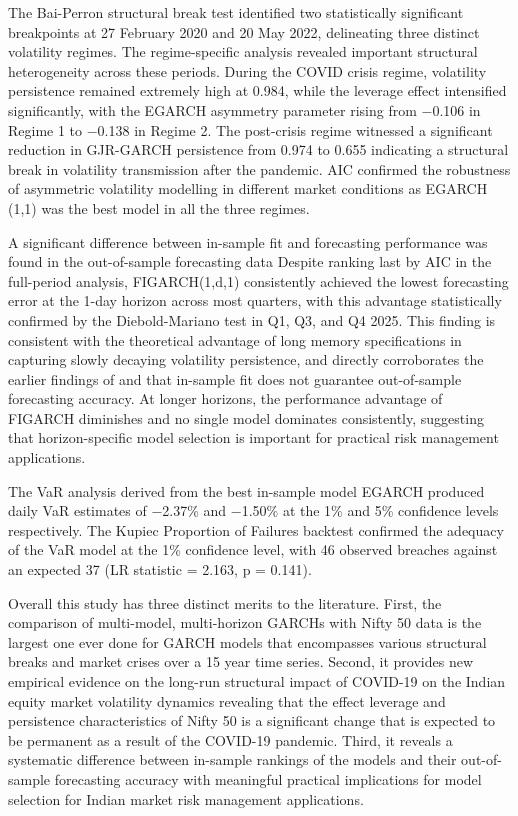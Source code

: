 The Bai-Perron structural break test identified two statistically significant breakpoints at 27 February 2020 and 20 May 2022, delineating three distinct volatility regimes. The regime-specific analysis revealed important structural heterogeneity across these periods. During the COVID crisis regime, volatility persistence remained extremely high at 0.984, while the leverage effect intensified significantly, with the EGARCH asymmetry parameter rising from −0.106 in Regime 1 to −0.138 in Regime 2. The post-crisis regime witnessed a significant reduction in GJR-GARCH persistence from 0.974 to 0.655 indicating a structural break in volatility transmission after the pandemic. AIC confirmed the robustness of asymmetric volatility modelling in different market conditions as EGARCH (1,1) was the best model in all the three regimes.


A significant difference between in-sample fit and forecasting performance was found in the out-of-sample forecasting data Despite ranking last by AIC in the full-period analysis, FIGARCH(1,d,1) consistently achieved the lowest forecasting error at the 1-day horizon across most quarters, with this advantage statistically confirmed by the Diebold-Mariano test in Q1, Q3, and Q4 2025. This finding is consistent with the theoretical advantage of long memory specifications in capturing slowly decaying volatility persistence, and directly corroborates the earlier findings of \citet{hansen2005} and \cite{poon2003} that in-sample fit does not guarantee out-of-sample forecasting accuracy. At longer horizons, the performance advantage of FIGARCH diminishes and no single model dominates consistently, suggesting that horizon-specific model selection is important for practical risk management applications.


The VaR analysis derived from the best in-sample model EGARCH produced daily VaR estimates of −2.37\% and −1.50\% at the 1\% and 5\% confidence levels respectively. The Kupiec Proportion of Failures backtest confirmed the adequacy of the VaR model at the 1\% confidence level, with 46 observed breaches against an expected 37 (LR statistic = 2.163, p = 0.141).


Overall this study has three distinct merits to the literature. First, the comparison of multi-model, multi-horizon GARCHs with Nifty 50 data is the largest one ever done for GARCH models that encompasses various structural breaks and market crises over a 15 year time series. Second, it provides new empirical evidence on the long-run structural impact of COVID-19 on the Indian equity market volatility dynamics revealing that the effect leverage and persistence characteristics of Nifty 50 is a significant change that is expected to be permanent as a result of the COVID-19 pandemic. Third, it reveals a systematic difference between in-sample rankings of the models and their out-of-sample forecasting accuracy with meaningful practical implications for model selection for Indian market risk management applications.

